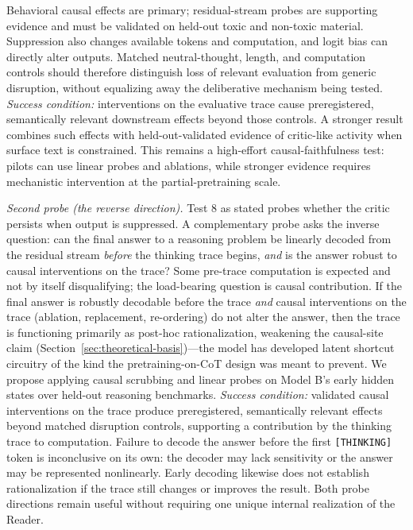 Behavioral causal effects are primary; residual-stream probes are supporting
evidence and must be validated on held-out toxic and non-toxic material.
Suppression also changes available tokens and computation, and logit bias can
directly alter outputs. Matched neutral-thought, length, and computation
controls should therefore distinguish loss of relevant evaluation from generic
disruption, without equalizing away the deliberative mechanism being tested.
\emph{Success condition:} interventions on the evaluative trace cause
preregistered, semantically relevant downstream effects beyond those controls.
A stronger result combines such effects with held-out-validated evidence of
critic-like activity when surface text is constrained. This remains a
high-effort causal-faithfulness test: pilots can use linear probes and
ablations, while stronger evidence requires mechanistic intervention at the
partial-pretraining scale.

\textit{Second probe (the reverse direction).} Test 8 as stated probes
whether the critic persists when output is suppressed. A complementary
probe asks the inverse question: can the final answer to a reasoning
problem be linearly decoded from the residual stream \emph{before} the
thinking trace begins, \emph{and} is the answer robust to causal
interventions on the trace? Some pre-trace computation is expected and
not by itself disqualifying; the load-bearing question is causal
contribution. If the final answer is robustly decodable before the trace
\emph{and} causal interventions on the trace (ablation, replacement,
re-ordering) do not alter the answer, then the trace is functioning
primarily as post-hoc rationalization, weakening the causal-site claim
(Section~\ref{sec:theoretical-basis})---the model has developed latent
shortcut circuitry of the kind the pretraining-on-CoT design was meant to
prevent. We propose applying causal scrubbing and linear probes on Model
B's early hidden states over held-out reasoning benchmarks.
\emph{Success condition:} validated causal interventions on the trace
produce preregistered, semantically relevant effects beyond matched disruption
controls, supporting a contribution by the thinking trace to computation.
Failure to decode the answer before the first \texttt{[THINKING]} token is
inconclusive on its own: the decoder may lack sensitivity or the answer may
be represented nonlinearly. Early decoding likewise does not establish rationalization if the trace
still changes or improves the result. Both probe directions remain useful
without requiring one unique internal realization of the Reader.

